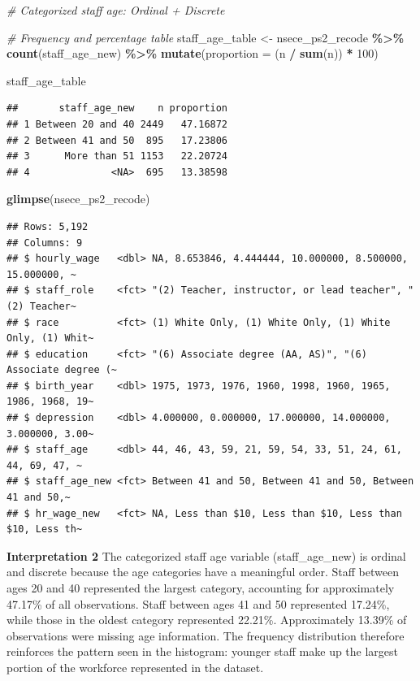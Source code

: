 \documentclass[
]{article}
\newenvironment{Shaded}{\begin{snugshade}}{\end{snugshade}}
\newcommand{\AttributeTok}[1]{\textcolor[rgb]{0.13,0.29,0.53}{#1}}
\newcommand{\CommentTok}[1]{\textcolor[rgb]{0.56,0.35,0.01}{\textit{#1}}}
\newcommand{\DecValTok}[1]{\textcolor[rgb]{0.00,0.00,0.81}{#1}}
\newcommand{\FunctionTok}[1]{\textcolor[rgb]{0.13,0.29,0.53}{\textbf{#1}}}
\newcommand{\NormalTok}[1]{#1}
\newcommand{\OtherTok}[1]{\textcolor[rgb]{0.56,0.35,0.01}{#1}}
\newcommand{\SpecialCharTok}[1]{\textcolor[rgb]{0.81,0.36,0.00}{\textbf{#1}}}
\begin{document}
\begin{Shaded}
\begin{Highlighting}[]
\CommentTok{\# Categorized staff age: Ordinal + Discrete}

\CommentTok{\# Frequency and percentage table}
\NormalTok{staff\_age\_table }\OtherTok{\textless{}{-}}
\NormalTok{  nsece\_ps2\_recode }\SpecialCharTok{\%\textgreater{}\%}
  \FunctionTok{count}\NormalTok{(staff\_age\_new) }\SpecialCharTok{\%\textgreater{}\%}
  \FunctionTok{mutate}\NormalTok{(}\AttributeTok{proportion =}\NormalTok{ (n }\SpecialCharTok{/} \FunctionTok{sum}\NormalTok{(n)) }\SpecialCharTok{*} \DecValTok{100}\NormalTok{)}

\NormalTok{staff\_age\_table}
\end{Highlighting}
\end{Shaded}

\begin{verbatim}
##       staff_age_new    n proportion
## 1 Between 20 and 40 2449   47.16872
## 2 Between 41 and 50  895   17.23806
## 3      More than 51 1153   22.20724
## 4              <NA>  695   13.38598
\end{verbatim}

\begin{Shaded}
\begin{Highlighting}[]
\FunctionTok{glimpse}\NormalTok{(nsece\_ps2\_recode)}
\end{Highlighting}
\end{Shaded}

\begin{verbatim}
## Rows: 5,192
## Columns: 9
## $ hourly_wage   <dbl> NA, 8.653846, 4.444444, 10.000000, 8.500000, 15.000000, ~
## $ staff_role    <fct> "(2) Teacher, instructor, or lead teacher", "(2) Teacher~
## $ race          <fct> (1) White Only, (1) White Only, (1) White Only, (1) Whit~
## $ education     <fct> "(6) Associate degree (AA, AS)", "(6) Associate degree (~
## $ birth_year    <dbl> 1975, 1973, 1976, 1960, 1998, 1960, 1965, 1986, 1968, 19~
## $ depression    <dbl> 4.000000, 0.000000, 17.000000, 14.000000, 3.000000, 3.00~
## $ staff_age     <dbl> 44, 46, 43, 59, 21, 59, 54, 33, 51, 24, 61, 44, 69, 47, ~
## $ staff_age_new <fct> Between 41 and 50, Between 41 and 50, Between 41 and 50,~
## $ hr_wage_new   <fct> NA, Less than $10, Less than $10, Less than $10, Less th~
\end{verbatim}

\textbf{Interpretation 2} The categorized staff age variable
(staff\_age\_new) is ordinal and discrete because the age categories
have a meaningful order. Staff between ages 20 and 40 represented the
largest category, accounting for approximately 47.17\% of all
observations. Staff between ages 41 and 50 represented 17.24\%, while
those in the oldest category represented 22.21\%. Approximately 13.39\%
of observations were missing age information. The frequency distribution
therefore reinforces the pattern seen in the histogram: younger staff
make up the largest portion of the workforce represented in the dataset.
\end{document}
